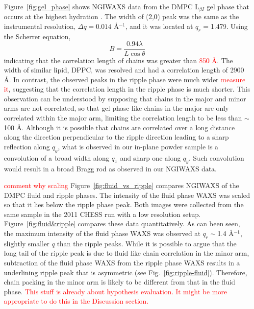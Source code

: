 Figure~\ref{fig:gel_phase} shows NGIWAXS data from the DMPC L$_{\beta I}$
gel phase that occurs at the highest hydration \cite{ref:Smith,Tristram-Nagle02}.
The width of (2,0) peak was the same as the instrumental resolution, 
$\Delta q = 0.014$ \AA$^{-1}$, and it was located at $q_r$ = 1.479.
Using the Scherrer equation,
\[
  B = \frac{0.94\lambda}{L\cos\theta}
\]
indicating that the correlation length of chains was greater than 
\textcolor{red}{850 \AA}.
The width of similar lipid, DPPC, was resolved and had a correlation 
length of 2900 \AA \cite{ref:Sun94}.
In contrast, the observed peaks in the ripple phase were much wider
\textcolor{red}{measure it},
suggesting that the correlation length in the ripple phase is much shorter.
This observation can be understood by supposing that chains in the major
and minor arms are not correlated, so that gel phase like chains in the 
major are only correlated within the major arm, limiting the correlation
length to be less than $\sim$100 \AA.
Although
it is possible that chains are correlated over a long distance 
along the direction perpendicular to the ripple direction leading to
a sharp reflection along $q_y$,
what is observed in our in-plane powder sample is a convolution
of a broad width along $q_x$ and sharp one along $q_y$. Such convolution
would result in a broad Bragg rod as observed in our NGIWAXS data. 

\textcolor{red}{comment why scaling}
Figure~\ref{fig:fluid_vs_ripple} compares NGIWAXS of the DMPC fluid and ripple phases.
The intensity of the fluid phase WAXS was scaled so that
it lies below the ripple phase peak. 
Both images were collected from the same sample in the 2011 CHESS run with 
a low resolution setup. Figure~\ref{fig:fluid&ripple} compares these data 
quantitatively. As can been seen, the maximum intensity of the fluid phase
WAXS was observed at $q_r \sim$1.4 \AA$^{-1}$, slightly smaller $q$ than 
the ripple peaks. While it is possible to argue that 
the long tail of the ripple peak is due to fluid like chain correlation
in the minor arm, subtraction of the fluid phase WAXS from the ripple phase
WAXS results in a underlining ripple peak that is asymmetric (see Fig.~\ref{fig:ripple-fluid}).
Therefore, chain packing in the minor arm is likely to be different from that 
in the fluid phase.
\textcolor{red}{This stuff is already about hypothesis evaluation. It might
be more appropriate to do this in the Discussion section.}

